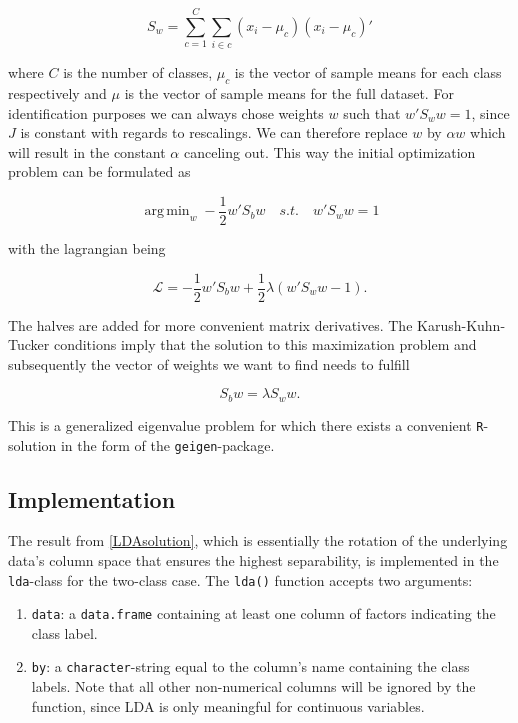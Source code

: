 \documentclass{article}
\DeclareMathOperator*{\argmin}{arg\,min}
\begin{document}
\begin{equation}
\label{Sw}
S_w = \sum_{c=1}^{C}\sum_{i \in c}(x_i - \mu_c)(x_i - \mu_c)\prime
\end{equation} 

where $C$ is the number of classes, $\mu_c$ is the vector of sample means for each class respectively and $\mu$ is the vector of sample means for the full dataset. For identification purposes we can always chose weights $w$ such that $w\prime S_w w = 1$, since $J$ is constant with regards to rescalings. We can therefore replace $w$ by $\alpha w$ which will result in the constant $\alpha$ canceling out. This way the initial optimization problem can be formulated as

\begin{equation}
\argmin_{w} -\frac{1}{2} w\prime S_b w \quad s.t. \quad w \prime S_w w = 1
\end{equation}

with the lagrangian being

\begin{equation}
\mathcal{L} = -\frac{1}{2} w\prime S_b w + \frac{1}{2}\lambda\left(w\prime S_w w - 1\right).
\end{equation}

The halves are added for more convenient matrix derivatives. The Karush-Kuhn-Tucker conditions imply that the solution to this maximization problem and subsequently the vector of weights we want to find needs to fulfill

\begin{equation}
\label{LDAsolution}
S_b w = \lambda S_w w.
\end{equation}

This is a generalized eigenvalue problem for which there exists a convenient \texttt{R}-solution in the form of the \texttt{geigen}-package.

\subsection{Implementation}

The result from \ref{LDAsolution}, which is essentially the rotation of the underlying data's column space that ensures the highest separability, is implemented in the \texttt{lda}-class for the two-class case. The \texttt{lda()} function accepts two arguments:

\begin{enumerate}
\item \texttt{data}: a \texttt{data.frame} containing at least one column of factors indicating the class label.
\item \texttt{by}: a \texttt{character}-string equal to the column's name containing the class labels. Note that all other non-numerical columns will be ignored by the function, since LDA is only meaningful for continuous variables.
\end{enumerate} 
\end{document}
